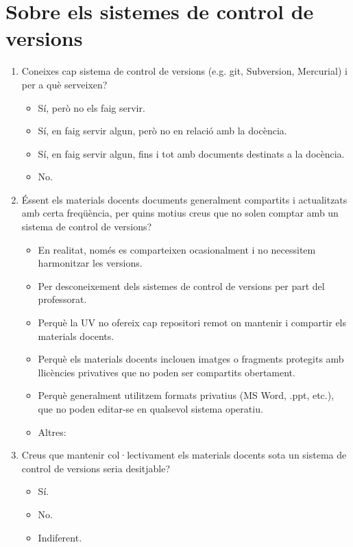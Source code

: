 \documentclass[a4paper,12pt]{article}
\newcounter{preg}[section]
\begin{document}
\section{Sobre els sistemes de control de versions}
\begin{enumerate}
\item {} Coneixes cap sistema de control de versions (e.g. \textsf{git}, Subversion, Mercurial) i
      per a què serveixen?
   \begin{itemize}
   \item Sí, però no els faig servir.
   \item Sí, en faig servir algun, però no en relació amb la docència.
   \item Sí, en faig servir algun, fins i tot amb documents destinats a la docència.
   \item No.
   \end{itemize}

\item {} Éssent els materials docents documents generalment compartits i actualitzats amb certa
      freqüència, per quins motius creus que no solen comptar amb un sistema de control de
      versions?
   \begin{itemize}
   \item En realitat, només es comparteixen ocasionalment i no necessitem harmonitzar les versions.
   \item Per desconeixement dels sistemes de control de versions per part del professorat.
   \item Perquè la UV no ofereix cap repositori remot on mantenir i compartir els materials
         docents.
   \item Perquè els materials docents inclouen imatges o fragments protegits amb llicències
         privatives que no poden ser compartits obertament.
   \item Perquè generalment utilitzem formats privatius (MS Word, .ppt, etc.), que no poden
         editar-se en qualsevol sistema operatiu.
   \item Altres:
   \vspace*{1cm}
   \end{itemize}

\item {} Creus que mantenir col·lectivament els materials docents sota un sistema de control de
      versions seria desitjable?
   \begin{itemize}
   \item Sí.
   \item No.
   \item Indiferent.
   \end{itemize}


\end{enumerate}
\end{document}

